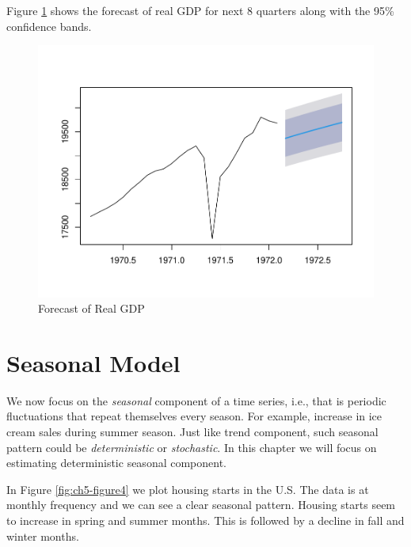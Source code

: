\documentclass[]{book}
\theoremstyle{definition}
\theoremstyle{definition}
\theoremstyle{definition}
\theoremstyle{remark}
\begin{document}
Figure \ref{fig:ch5-figure3} shows the forecast of real GDP for next 8 quarters along with the 95\% confidence bands.

\begin{figure}

{\centering \includegraphics[width=0.8\linewidth]{bookdown-demo_files/figure-latex/ch5-figure3-1} 

}

\caption{Forecast of Real GDP}\label{fig:ch5-figure3}
\end{figure}

\hypertarget{seasonal-model}{%
\section{Seasonal Model}\label{seasonal-model}}

We now focus on the \emph{seasonal} component of a time series, i.e., that is periodic fluctuations that repeat themselves every season. For example, increase in ice cream sales during summer season. Just like trend component, such seasonal pattern could be \emph{deterministic} or \emph{stochastic}. In this chapter we will focus on estimating deterministic seasonal component.

In Figure \ref{fig:ch5-figure4} we plot housing starts in the U.S. The data is at monthly frequency and we can see a clear seasonal pattern. Housing starts seem to increase in spring and summer months. This is followed by a decline in fall and winter months.
\end{document}
